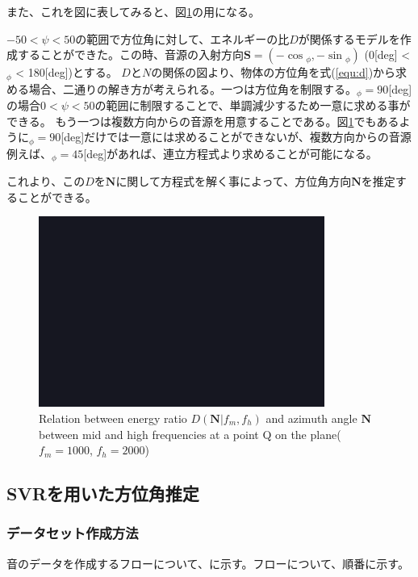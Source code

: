 また、これを図に表してみると、図\ref{fig:d-n}の用になる。

$-50< \psi < 50$の範囲で方位角に対して、エネルギーの比$D$が関係するモデルを作成することができた。この時、音源の入射方向$\mathbf{S} = (-\cos{_\phi}, -\sin{_\phi})$ (0[deg] < $_\phi$ < 180[deg])とする。
$D$と$N$の関係の図より、物体の方位角を式(\ref{equ:d})から求める場合、二通りの解き方が考えられる。一つは方位角を制限する。$_\phi=90$[deg]の場合$0<\psi<50$の範囲に制限することで、単調減少するため一意に求める事ができる。
もう一つは複数方向からの音源を用意することである。図\ref{fig:d-n}でもあるように$_\phi=90$[deg]だけでは一意には求めることができないが、複数方向からの音源例えば、$_\phi = 45$[deg]があれば、連立方程式より求めることが可能になる。

これより、この$D$を$\mathbf{N}$に関して方程式を解く事によって、方位角方向$\mathbf{N}$を推定することができる。

\begin{figure}[t]
  \begin{center}
  \vspace{1zh}
    \includegraphics[width=0.7\linewidth]{images/fig_sample.png}   
  \end{center}
  \caption{Relation between energy ratio $D(\mathbf{N}|f_m, f_h)$ and azimuth angle $\mathbf{N}$ between mid and high frequencies at a point Q on the plane($f_m = 1000$, $f_h = 2000$)}
  \label{fig:d-n}
\end{figure}

\subsection{SVRを用いた方位角推定}
\label{sec:svr_method}

\subsubsection{データセット作成方法}
\label{sec:make_data_set}
音のデータを作成するフローについて、に示す。フローについて、順番に示す。

